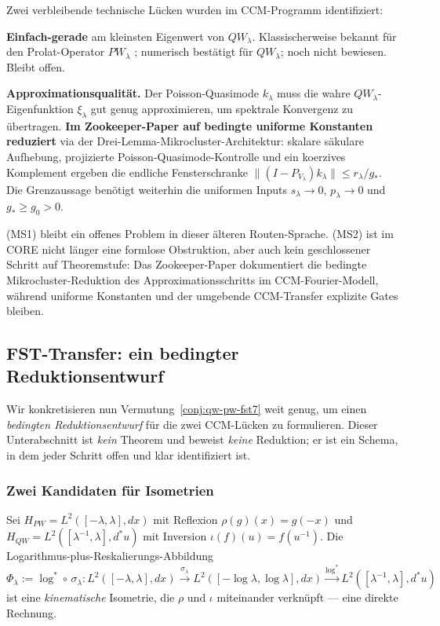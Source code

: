 \documentclass[11pt,a4paper]{article}
\theoremstyle{plain}
\theoremstyle{definition}
\begin{document}
Zwei verbleibende technische Lücken wurden im CCM-Programm identifiziert:
\begin{description}[leftmargin=*,style=nextline]
\item[(MS1)] \textbf{Einfach-gerade} am kleinsten Eigenwert von $QW_\lambda$.
  Klassischerweise bekannt für den Prolat-Operator $PW_\lambda$ \cite{SlepianPollack1961};
  numerisch bestätigt für $QW_\lambda$; noch nicht bewiesen. Bleibt offen.
\item[(MS2)] \textbf{Approximationsqualität.} Der Poisson-Quasimode
  $k_\lambda$ muss die wahre $QW_\lambda$-Eigenfunktion $\xi_\lambda$
  gut genug approximieren, um spektrale Konvergenz zu übertragen.
  \textbf{Im Zookeeper-Paper auf bedingte uniforme Konstanten reduziert}
  via der Drei-Lemma-Mikrocluster-Architektur: skalare säkulare Aufhebung,
  projizierte Poisson-Quasimode-Kontrolle und ein koerzives Komplement ergeben
  die endliche Fensterschranke
  $\|(I-P_{V_\lambda})k_\lambda\| \leq r_\lambda/g_*$. Die Grenzaussage
  benötigt weiterhin die uniformen Inputs $s_\lambda\to0$, $p_\lambda\to0$
  und $g_*\ge g_0>0$.
\end{description}

(MS1) bleibt ein offenes Problem in dieser älteren Routen-Sprache. (MS2)
ist im CORE nicht länger eine formlose Obstruktion, aber auch kein
geschlossener Schritt auf Theoremstufe: Das Zookeeper-Paper dokumentiert die
bedingte Mikrocluster-Reduktion des Approximationsschritts im
CCM-Fourier-Modell, während uniforme Konstanten und der umgebende
CCM-Transfer explizite Gates bleiben.

\subsection{FST-Transfer: ein bedingter Reduktionsentwurf}
\label{sec:fst-transfer}

Wir konkretisieren nun Vermutung~\ref{conj:qw-pw-fst7} weit genug, um
einen \emph{bedingten Reduktionsentwurf} für die zwei CCM-Lücken zu formulieren.
Dieser Unterabschnitt ist \emph{kein} Theorem und beweist \emph{keine} Reduktion;
er ist ein Schema, in dem jeder Schritt offen und klar identifiziert ist.

\subsubsection{Zwei Kandidaten für Isometrien}

Sei $H_{PW} = L^2([-\lambda, \lambda], dx)$ mit Reflexion
$\rho(g)(x) = g(-x)$ und $H_{QW} = L^2([\lambda^{-1}, \lambda], d^\ast u)$
mit Inversion $\iota(f)(u) = f(u^{-1})$. Die Logarithmus-plus-Reskalierungs-Abbildung
\[
  \Phi_\lambda := \log^\ast \circ \, \sigma_\lambda :
    L^2([-\lambda, \lambda], dx) \xrightarrow{\sigma_\lambda}
    L^2([-\log\lambda, \log\lambda], dx)
    \xrightarrow{\log^\ast}
    L^2([\lambda^{-1}, \lambda], d^\ast u)
\]
ist eine \emph{kinematische} Isometrie, die $\rho$ und $\iota$ miteinander verknüpft ---
eine direkte Rechnung.
\end{document}
